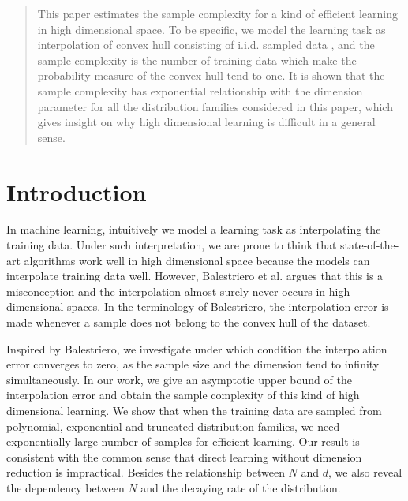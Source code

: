 \documentclass[conference,a4paper]{IEEEtran}
\begin{document}
\maketitle

\begin{abstract}
  This paper estimates the sample complexity for a kind of efficient learning in high dimensional space.
  To be specific, we model the learning task as interpolation of convex hull consisting of i.i.d. sampled data
  , and the sample complexity is the number of training data which make the probability measure of the convex hull
  tend to one. It is shown that the sample complexity has exponential relationship with the dimension parameter for all the distribution families
  considered in this paper, which gives insight on why high dimensional learning is difficult in a general sense. 
\end{abstract}


\section{Introduction}
\label{sec:intro}
In machine learning, intuitively we model a learning task as interpolating the
training data. Under such interpretation, we are prone to think that state-of-the-art
algorithms work well in high dimensional space because the models can interpolate training data well. 
However, Balestriero et al. \cite{balestriero2021learning}
argues that this is a misconception and the interpolation almost surely never occurs in high-dimensional spaces.
In the terminology of Balestriero, the interpolation error is made whenever a sample does not belong to the convex hull of the dataset.

Inspired by Balestriero, we investigate under which condition the interpolation error converges to zero,
as the sample size and the dimension tend to infinity simultaneously. In our work, we give
an asymptotic upper bound of the interpolation error and obtain the sample complexity of this kind of
high dimensional learning. We show that when the training data are sampled from polynomial, exponential and truncated distribution families,
we need exponentially large number of samples for efficient learning. Our result is consistent with the common sense
that direct learning
without dimension reduction is impractical. Besides the relationship between $N$ and $d$,
we also reveal the dependency between $N$ and the decaying rate of the distribution.
\end{document}
